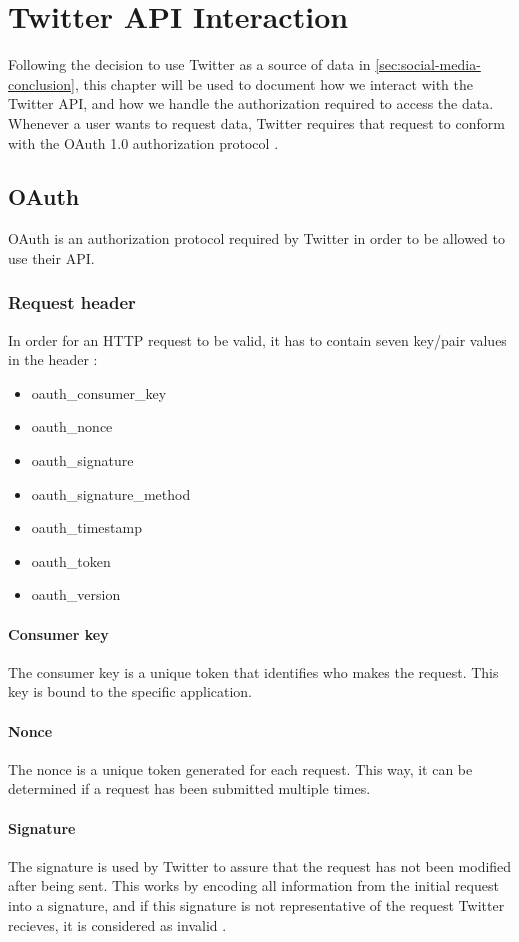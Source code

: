 \chapter{Twitter API Interaction}\label{cha:twitterAPI}
Following the decision to use Twitter as a source of data in
\autoref{sec:social-media-conclusion}, this chapter will be used to document how
we interact with the Twitter API, and how we handle the authorization required
to access the data. Whenever a user wants to request data, Twitter requires that
request to conform with the OAuth 1.0 authorization protocol \citep{OAuth1}.

\section{OAuth}
OAuth is an authorization protocol required by Twitter in order to be allowed to
use their \ac{API}.

\subsection{Request header}
In order for an \ac{HTTP} request to be valid, it has to
contain seven key/pair values in the header \citep{TwitterAPIAuth}:
\begin{itemize}
  \item oauth\_consumer\_key
  \item oauth\_nonce
  \item oauth\_signature
  \item oauth\_signature\_method
  \item oauth\_timestamp
  \item oauth\_token
  \item oauth\_version
\end{itemize}

\subsubsection*{Consumer key}
The consumer key is a unique token that identifies who makes the request.
This key is bound to the specific application.

\subsubsection*{Nonce}
The nonce is a unique token generated for each request. This way, it can be
determined if a request has been submitted multiple times. 

\subsubsection*{Signature}
The signature is used by Twitter to assure that the request has not been
modified after being sent. This works by encoding all information from the
initial request into a signature, and if this signature is not representative of
the request Twitter recieves, it is considered as invalid
\citep[sec 3.4]{OAuth1}.

